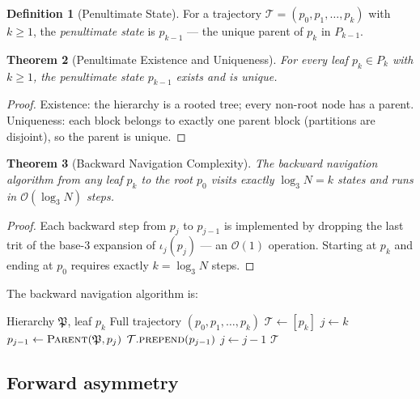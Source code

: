 \documentclass[twocolumn,10pt,a4paper]{article}
\theoremstyle{thmstyle}
\newtheorem{theorem}{Theorem}[section]
\theoremstyle{definition}
\newtheorem{definition}[theorem]{Definition}
\theoremstyle{remark}
\begin{document}
\begin{definition}[Penultimate State]
\label{def:penultimate}
For a trajectory $\mathcal{T} = (p_0, p_1, \ldots, p_k)$ with $k \geq 1$,
the \emph{penultimate state} is $p_{k-1}$ — the unique parent of
$p_k$ in $P_{k-1}$.
\end{definition}

\begin{theorem}[Penultimate Existence and Uniqueness]
\label{thm:penultimate}
For every leaf $p_k \in P_k$ with $k \geq 1$, the penultimate state
$p_{k-1}$ exists and is unique.
\end{theorem}

\begin{proof}
Existence: the hierarchy is a rooted tree; every non-root node has a parent.
Uniqueness: each block belongs to exactly one parent block (partitions are
disjoint), so the parent is unique.
\end{proof}

\begin{theorem}[Backward Navigation Complexity]
\label{thm:backward_complexity}
The backward navigation algorithm from any leaf $p_k$ to the root $p_0$
visits exactly $\log_3 N = k$ states and runs in $\mathcal{O}(\log_3 N)$ steps.
\end{theorem}

\begin{proof}
Each backward step from $p_j$ to $p_{j-1}$ is implemented by dropping
the last trit of the base-3 expansion of $\iota_j(p_j)$ — an $\mathcal{O}(1)$
operation. Starting at $p_k$ and ending at $p_0$ requires exactly $k = \log_3 N$
steps.
\end{proof}

The backward navigation algorithm is:

\begin{algorithm}[h]
\caption{Backward trajectory completion}
\begin{algorithmic}[1]
\REQUIRE Hierarchy $\mathfrak{P}$, leaf $p_k$
\ENSURE Full trajectory $(p_0, p_1, \ldots, p_k)$
\STATE $\mathcal{T} \leftarrow [p_k]$
\STATE $j \leftarrow k$
  \STATE $p_{j-1} \leftarrow \textsc{Parent}(\mathfrak{P}, p_j)$
  \STATE $\mathcal{T}.\textsc{prepend}(p_{j-1})$
  \STATE $j \leftarrow j - 1$
\ENDWHILE
\RETURN $\mathcal{T}$
\end{algorithmic}
\end{algorithm}

\subsection{Forward asymmetry}
\end{document}

